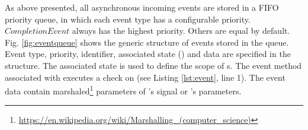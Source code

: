 As above presented, all asynchronous incoming events are stored in a FIFO priority queue, in which each event type has a configurable priority. $CompletionEvent$ always has the highest priority. Others are equal by default. 
Fig. \ref{fig:eventqueue} shows the generic structure of events stored in the queue.  
Event type, priority, identifier, associated state () and data are specified in the structure. 
The associated state  is used to define the scope of s. The event method associated with  executes a check on  (see Listing \ref{lst:event}, line 1).
The event data contain marshaled\footnote{\url{https://en.wikipedia.org/wiki/Marshalling_(computer_science)}} parameters of 's signal or 's parameters.

